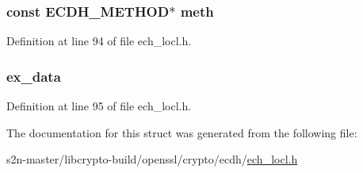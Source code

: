 \subsubsection[{\texorpdfstring{meth}{meth}}]{\setlength{\rightskip}{0pt plus 5cm}const {\bf E\+C\+D\+H\+\_\+\+M\+E\+T\+H\+OD}$\ast$ meth}\hypertarget{structecdh__data__st_add3e766f3448fe1d0f36b8528f44d91a}{}\label{structecdh__data__st_add3e766f3448fe1d0f36b8528f44d91a}


Definition at line 94 of file ech\+\_\+locl.\+h.

\subsubsection[{\texorpdfstring{ex\+\_\+data}{ex_data}}]{ ex\+\_\+data}\hypertarget{structecdh__data__st_ac3e4fd59d6ee44a81f3a58114613c1e2}{}\label{structecdh__data__st_ac3e4fd59d6ee44a81f3a58114613c1e2}


Definition at line 95 of file ech\+\_\+locl.\+h.



The documentation for this struct was generated from the following file\+:\begin{DoxyCompactItemize}
\item 
s2n-\/master/libcrypto-\/build/openssl/crypto/ecdh/\hyperlink{ech__locl_8h}{ech\+\_\+locl.\+h}\end{DoxyCompactItemize}
